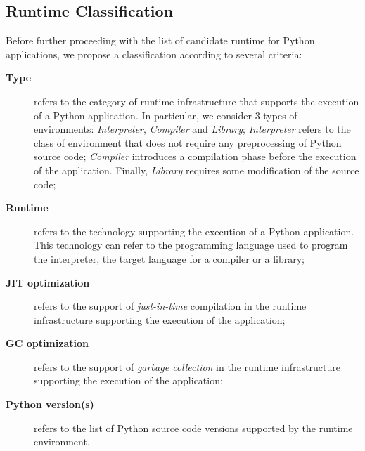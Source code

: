 \subsection{Runtime Classification}
Before further proceeding with the list of candidate runtime for Python applications, we propose a classification according to several criteria:
\begin{description}
    \item[\bf Type] refers to the category of runtime infrastructure that supports the execution of a Python application.
        In particular, we consider 3 types of environments: \emph{Interpreter}, \emph{Compiler} and \emph{Library};
        \emph{Interpreter} refers to the class of environment that does not require any preprocessing of Python source code;
        \emph{Compiler} introduces a compilation phase before the execution of the application.
        Finally, \emph{Library} requires some modification of the source code;
    \item[\bf Runtime] refers to the technology supporting the execution of a Python application.
        This technology can refer to the programming language used to program the interpreter, the target language for a compiler or a library;
    \item[\bf JIT optimization] refers to the support of \emph{just-in-time} compilation in the runtime infrastructure supporting the execution of the application;
    \item[\bf GC optimization] refers to the support of \emph{garbage collection} in the runtime infrastructure supporting the execution of the application;
    \item[\bf Python version(s)] refers to the list of Python source code versions supported by the runtime environment.
\end{description}

